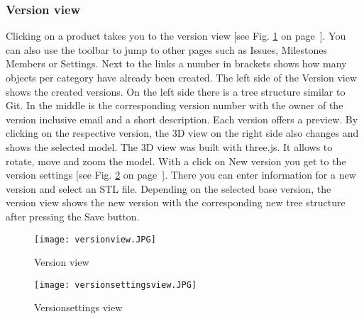     \subsubsection*{Version view}
    Clicking on a product takes you to the version view [see Fig. \ref{fig: versionview} on page~\pageref{fig: versionview}]. You can also use the toolbar to jump to other pages such as Issues, Milestones Members or Settings. Next to the links a number in brackets shows how many objects per category have already been created. The left side of the Version view shows the created versions. On the left side there is a tree structure similar to Git. In the middle is the corresponding version number with the owner of the version inclusive email and a short description. Each version offers a preview. By clicking on the respective version, the 3D view on the right side also changes and shows the selected model. The 3D view was built with three.js. It allows to rotate, move and zoom the model. With a click on New version you get to the version settings [see Fig. \ref{fig: versionsettingsview} on page~\pageref{fig: versionsettingsview}]. There you can enter information for a new version and select an STL file. Depending on the selected base version, the version view shows the new version with the corresponding new tree structure after pressing the Save button.
    
    \begin{figure}[h]
        \centering
        \texttt{[image: versionview.JPG]}
        \caption{Version view}
        \label{fig: versionview}
    \end{figure}

    \begin{figure}[h]
        \centering
        \texttt{[image: versionsettingsview.JPG]}
        \caption{Versionsettings view}
        \label{fig: versionsettingsview}
    \end{figure}

